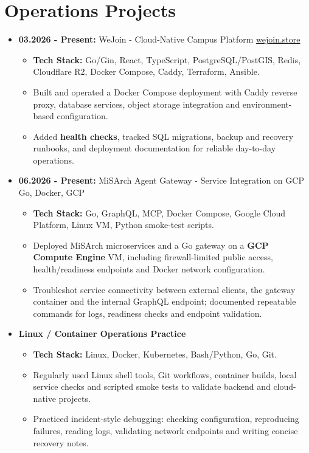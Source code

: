 \documentclass[10pt,a4paper]{article}
\newcommand{\cvright}[1]{\hfill{\normalfont #1}}
\newcommand{\cvproject}[3]{%
  \item \textbf{#1} #2 \cvright{#3}
}
\begin{document}
\section*{Operations Projects}
\begin{itemize}
  \cvproject{03.2026 - Present:}{WeJoin - Cloud-Native Campus Platform}{\href{https://wejoin.store}{wejoin.store}}
    \begin{itemize}
      \item \textbf{Tech Stack:} Go/Gin, React, TypeScript, PostgreSQL/PostGIS, Redis, Cloudflare R2, Docker Compose, Caddy, Terraform, Ansible.
      \item Built and operated a Docker Compose deployment with Caddy reverse proxy, database services, object storage integration and environment-based configuration.
      \item Added \textbf{health checks}, tracked SQL migrations, backup and recovery runbooks, and deployment documentation for reliable day-to-day operations.
    \end{itemize}

  \cvproject{06.2026 - Present:}{MiSArch Agent Gateway - Service Integration on GCP}{Go, Docker, GCP}
    \begin{itemize}
      \item \textbf{Tech Stack:} Go, GraphQL, MCP, Docker Compose, Google Cloud Platform, Linux VM, Python smoke-test scripts.
      \item Deployed MiSArch microservices and a Go gateway on a \textbf{GCP Compute Engine} VM, including firewall-limited public access, health/readiness endpoints and Docker network configuration.
      \item Troubleshot service connectivity between external clients, the gateway container and the internal GraphQL endpoint; documented repeatable commands for logs, readiness checks and endpoint validation.
    \end{itemize}

  \item \textbf{Linux / Container Operations Practice}
    \begin{itemize}
      \item \textbf{Tech Stack:} Linux, Docker, Kubernetes, Bash/Python, Go, Git.
      \item Regularly used Linux shell tools, Git workflows, container builds, local service checks and scripted smoke tests to validate backend and cloud-native projects.
      \item Practiced incident-style debugging: checking configuration, reproducing failures, reading logs, validating network endpoints and writing concise recovery notes.
    \end{itemize}
\end{itemize}
\end{document}

